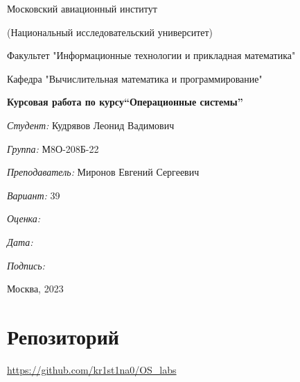 \documentclass[a4paper, 12pt]{article}
\begin{document}
\thispagestyle{empty}	
\begin{center}
	Московский авиационный институт
	
	(Национальный исследовательский университет)
	
	Факультет "Информационные технологии и прикладная математика"
	
	Кафедра "Вычислительная математика и программирование"
	
\end{center}
\vspace{40ex}
\begin{center}
	\textbf{\large{Курсовая работа по курсу\linebreak \textquotedblleft Операционные системы\textquotedblright}}
\end{center}
\vspace{35ex}
\begin{flushright}
	\textit{Студент: } Кудрявов Леонид Вадимович
	
	\vspace{2ex}
	\textit{Группа: } М8О-208Б-22
	
	\vspace{2ex}
	\textit{Преподаватель: } Миронов Евгений Сергеевич
	
	\vspace{2ex}
	\textit{Вариант: } 39
	
	\vspace{2ex}
	\textit{Оценка: } \underline{\quad\quad\quad\quad\quad\quad}
	
	 \vspace{2ex}
	\textit{Дата: } \underline{\quad\quad\quad\quad\quad\quad}
	
	\vspace{2ex}
	\textit{Подпись: } \underline{\quad\quad\quad\quad\quad\quad}
	
\end{flushright}

\vspace{5ex}

\begin{vfill}
	\begin{center}
		Москва, 2023
	\end{center}	
\end{vfill}
\newpage

\begingroup
\color{black}
\tableofcontents\newpage
\endgroup

\section{Репозиторий}
\href{https://github.com/kr1st1na0/OS\_labs}{https://github.com/kr1st1na0/OS\_labs}
\end{document}
